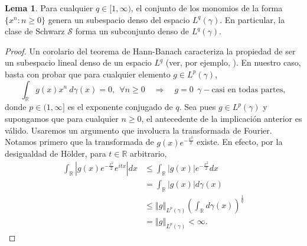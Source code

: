 \documentclass[letterpaper,twoside,12pt]{book}
\newcommand{\R}{\mathbb{R}}
\renewcommand{\S}{\mathcal{S}}
\newcommand{\1}{\mathds{1}}
\newcommand{\ent}{\Longrightarrow}
\newcommand{\norm}[1]{\left\Vert #1 \right\Vert}
\theoremstyle{definition}
\theoremstyle{definition}
\theoremstyle{remark}
\theoremstyle{definition}
\theoremstyle{definition}
\theoremstyle{definition}
\theoremstyle{definition}
\theoremstyle{definition}
\newtheorem{lema}{Lema}
\begin{document}
\begin{lema} 
Para cualquier $q\in [1,\infty)$, el conjunto de los monomios de la forma $\{x^n: n\geq0\}$ genera un subespacio denso del espacio $L^{q}(\gamma)$. En particular, la clase de Schwarz $\S$ forma un subconjunto denso de $L^q(\gamma)$.
\end{lema}
\begin{proof} 
   Un corolario del teorema de Hann-Banach caracteriza la propiedad de ser un subespacio lineal denso de un espacio $L^{q}$ (ver, por ejemplo, \cite[corolario 2.3.25]{bühler2018functional}). En nuestro caso, basta con probar que para cualquier elemento $g \in L^{p}(\gamma)$, 
   \[
   \int_\R g(x)x^{n} \ d\gamma(x)=0, \ \ \forall n\geq0  \quad \ent \quad g=0 \ \ \gamma- \text{casi en todas partes},
   \]
   donde $p\in (1,\infty]$ es el exponente conjugado de $q$. Sea pues $g\in L^{p}(\gamma)$ y supongamos que para cualquier $n\geq0$, el antecedente de la implicación anterior es válido. Usaremos un argumento que involucra la transformada de Fourier. Notamos primero que la transformada de $g(x)e^{-\frac{x^2}{2}}$ existe. En efecto, por la desigualdad de Hölder, para $t\in \R$ arbitrario,
      \begin{align*}
         \int_{\R}|g(x)e^{-\frac{x^2}{2}}e^{itx}|dx&\leq \int_{\R}|g(x)|e^{-\frac{x^2}{2}}dx\\
         &=\int_{\R}|g(x)|d\gamma(x)\\
         &\leq\norm{g}_{L^{p}(\gamma)}\left(\int_{\R}d\gamma(x)\right)^{\frac{1}{q}}\\
         &=\norm{g}_{L^{p}(\gamma)}<\infty.
      \end{align*}
   

\end{proof}
\end{document}
